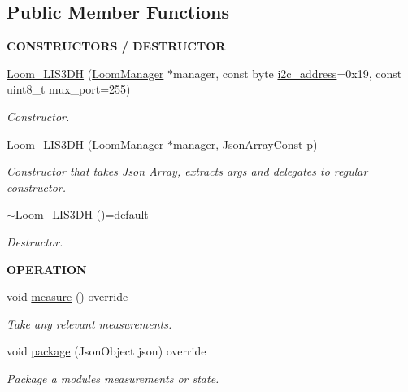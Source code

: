 \subsection*{Public Member Functions}
\begin{Indent}{\bf C\+O\+N\+S\+T\+R\+U\+C\+T\+O\+RS / D\+E\+S\+T\+R\+U\+C\+T\+OR}\par
\begin{DoxyCompactItemize}
\item 
\hyperlink{class_loom___l_i_s3_d_h_adb558356fc2ff63ab3678285c69db69d}{Loom\+\_\+\+L\+I\+S3\+DH} (\hyperlink{class_loom_manager}{Loom\+Manager} $\ast$manager, const byte \hyperlink{class_loom_i2_c_sensor_a6ff389c1f015152a9ebfccb037d3d90e}{i2c\+\_\+address}=0x19, const uint8\+\_\+t mux\+\_\+port=255)
\begin{DoxyCompactList}\small\item\em Constructor. \end{DoxyCompactList}\item 
\hyperlink{class_loom___l_i_s3_d_h_addefd08d7199599f886cc439bc82472d}{Loom\+\_\+\+L\+I\+S3\+DH} (\hyperlink{class_loom_manager}{Loom\+Manager} $\ast$manager, Json\+Array\+Const p)
\begin{DoxyCompactList}\small\item\em Constructor that takes Json Array, extracts args and delegates to regular constructor. \end{DoxyCompactList}\item 
\hyperlink{class_loom___l_i_s3_d_h_a59bbc85bf18c775852f164792b5a0a2b}{$\sim$\+Loom\+\_\+\+L\+I\+S3\+DH} ()=default
\begin{DoxyCompactList}\small\item\em Destructor. \end{DoxyCompactList}\end{DoxyCompactItemize}
\end{Indent}
\begin{Indent}{\bf O\+P\+E\+R\+A\+T\+I\+ON}\par
\begin{DoxyCompactItemize}
\item 
void \hyperlink{class_loom___l_i_s3_d_h_a03ae5f177043e9e44db23a7ca0fcc4e1}{measure} () override
\begin{DoxyCompactList}\small\item\em Take any relevant measurements. \end{DoxyCompactList}\item 
void \hyperlink{class_loom___l_i_s3_d_h_a1e96a7df95de03409692c4194d8300b0}{package} (Json\+Object json) override
\begin{DoxyCompactList}\small\item\em Package a modules measurements or state. \end{DoxyCompactList}\end{DoxyCompactItemize}
\end{Indent}
